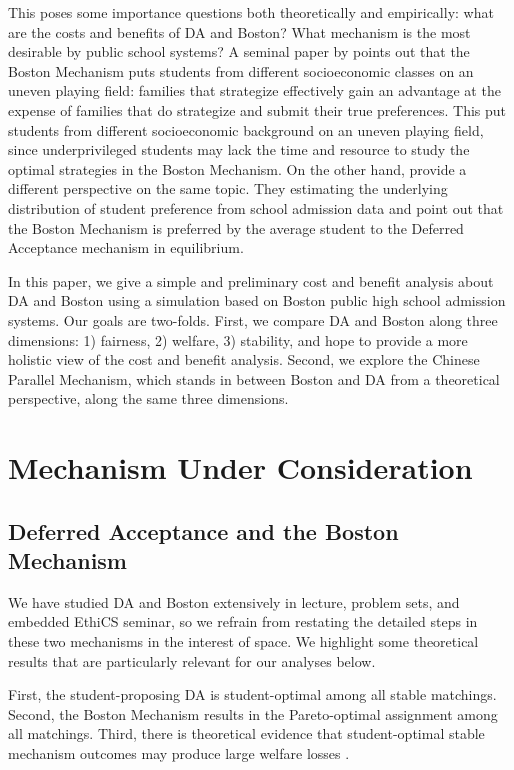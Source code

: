 \documentclass[10pt, reqno]{amsart}
\begin{document}
This poses some importance questions both theoretically and empirically: what are the costs and benefits of DA and Boston? What mechanism is the most desirable by public school systems? A seminal paper by \cite{pathak2008leveling} points out that the Boston Mechanism puts students from different socioeconomic classes on an uneven playing field: families that strategize effectively gain an advantage at the expense of families that do strategize and submit their true preferences. This put students from different socioeconomic background on an uneven playing field, since underprivileged students may lack the time and resource to study the optimal strategies in the Boston Mechanism. On the other hand, \cite{agarwal2018demand} provide a different perspective on the same topic. They estimating the underlying distribution of student preference from school admission data and point out that the Boston Mechanism is preferred by the average student to the Deferred Acceptance mechanism in equilibrium. 


In this paper, we give a simple and preliminary cost and benefit analysis about DA and Boston using a simulation based on Boston public high school admission systems. Our goals are two-folds.
First, we compare DA and Boston along three dimensions: 1) fairness, 2) welfare, 3) stability, and hope to provide a more holistic view of the cost and benefit analysis. Second, we explore the Chinese Parallel Mechanism, which stands in between Boston and DA from a theoretical perspective, along the same three dimensions. 

\section{Mechanism Under Consideration}

\subsection{Deferred Acceptance and the Boston Mechanism}

We have studied DA and Boston extensively in lecture, problem sets, and embedded EthiCS seminar, so we refrain from restating the detailed steps in these two mechanisms in the interest of space. We highlight some theoretical results that are particularly relevant for our analyses below. 

First, the student-proposing DA is student-optimal among all stable matchings. Second, the Boston Mechanism results in the Pareto-optimal assignment among all matchings. Third, there is theoretical evidence that student-optimal stable mechanism outcomes may produce large welfare losses \cite{kesten2010school}.
\end{document}
